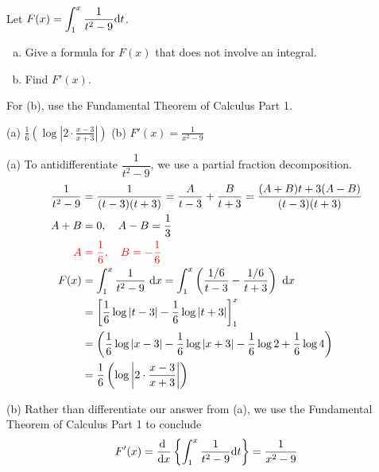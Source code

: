 \begin{Mquestion} Let $F(x) = \displaystyle\int_1^x \frac{1}{t^2-9} \mathrm{d}t$.
\begin{enumerate}[(a)]
\item
Give a formula for $F(x)$ that does not involve an integral.
\item Find $F'(x)$.
\end{enumerate}
\end{Mquestion}
\begin{hint}
For (b), use the Fundamental Theorem of Calculus Part 1.
\end{hint}
\begin{answer}
(a) $\displaystyle\frac{1}{6}\left(\log\left| 2\cdot\frac{x-3}{x+3} \right|\right)$
\qquad
(b) $F'(x) = \frac{1}{x^2-9}$
\end{answer}
\begin{solution}
(a) To antidifferentiate $\dfrac{1}{t^2-9}$, we use a partial fraction decomposition.
\begin{align*}
\frac{1}{t^2-9}&=\frac{1}{(t-3)(t+3)} = \frac{A}{t-3}+\frac{B}{t+3}=\frac{(A+B)t+3(A-B)}{(t-3)(t+3)}\\
A+B&=0,\quad A-B = \frac{1}{3}\\
\color{red}A&\color{red}=\frac{1}{6},\quad B = -\frac{1}{6}\\
F(x)&=\int_1^x\frac{1}{t^2-9}~\mathrm{d}x =
\int_1^x \left(\frac{1/6}{t-3}-\frac{1/6}{t+3}\right)~\mathrm{d}x\\
&=\left[\frac{1}{6}\log|t-3| - \frac{1}{6}\log|t+3|\right]_1^x\\
&=\left(\frac{1}{6}\log|x-3| - \frac{1}{6}\log|x+3|
-\frac{1}{6}\log2 +\frac{1}{6}\log4\right)\\
&=\frac{1}{6}\left(\log\left| 2\cdot\frac{x-3}{x+3} \right|\right)
\end{align*}

(b) Rather than differentiate our answer from (a), we use the Fundamental Theorem of Calculus Part 1 to conclude \[F'(x) = \diff{}{x}\left\{ \displaystyle\int_1^x \frac{1}{t^2-9} \dee{t}\right\} = \frac{1}{x^2-9}\]
\end{solution}




